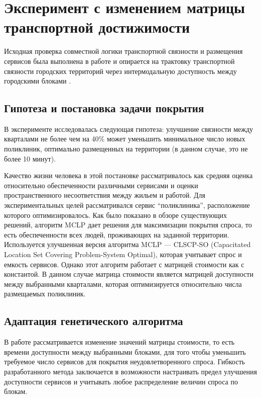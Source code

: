 \section{Эксперимент с изменением матрицы транспортной достижимости}
\label{sec:icccsa-connectivity-placement-experiment}

Исходная проверка совместной логики транспортной связности и размещения сервисов была выполнена в работе \cite{kontsevik2024connectivityPlacement} и опирается на трактовку транспортной связности городских территорий через интермодальную доступность между городскими блоками \cite{morozov2023transportConnectivity}.
\subsection{Гипотеза и постановка задачи покрытия}
\label{subsec:icccsa-hypothesis-location-coverage}

В эксперименте исследовалась следующая гипотеза: улучшение связности между кварталами не более чем на 40\% может уменьшить минимальное число новых поликлиник, оптимально размещенных на территории (в данном случае, это не более 10 минут).

Качество жизни человека в этой постановке рассматривалось как средняя оценка относительно обеспеченности различными сервисами и оценки пространственного несоответствия между жильем и работой. Для экспериментальных целей рассматривался сервис ``поликлиника'', расположение которого оптимизировалось. Как было показано в обзоре существующих решений, алгоритм MCLP дает решения для максимизации покрытия спроса, то есть обеспеченности всех людей, проживающих на заданной территории. Используется улучшенная версия алгоритма MCLP --- CLSCP-SO (Capacitated Location Set Covering Problem-System Optimal), которая учитывает спрос и емкость сервисов. Однако этот алгоритм работает с матрицей стоимости как с константой. В данном случае матрица стоимости является матрицей доступности между выбранными кварталами, которая оптимизируется относительно числа размещаемых поликлиник.

\subsection{Адаптация генетического алгоритма}
\label{subsec:icccsa-genetic-adaptation}

В работе рассматривается изменение значений матрицы стоимости, то есть времени доступности между выбранными блоками, для того чтобы уменьшить требуемое число сервисов для покрытия неудовлетворенного спроса. Гибкость разработанного метода заключается в возможности настраивать предел улучшения доступности сервисов и учитывать любое распределение величин спроса по блокам.


